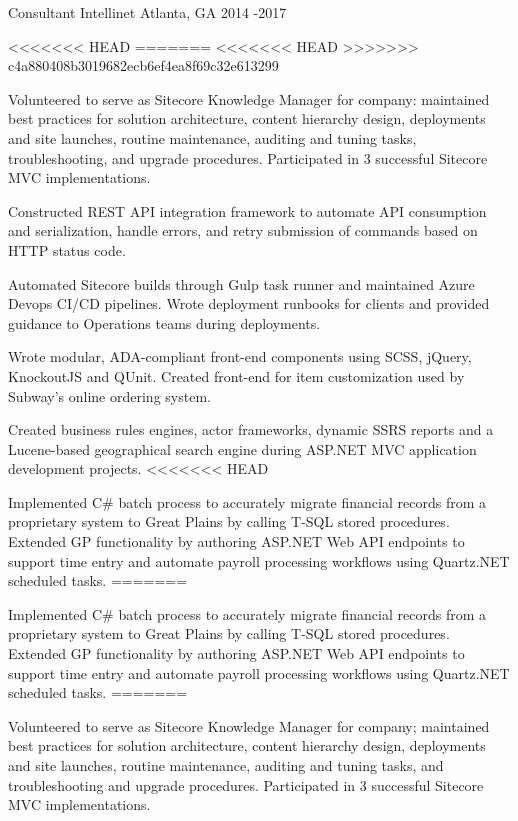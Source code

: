 \begin{cventries}
  \cventry
    {Consultant} %
    {Intellinet} %
    {Atlanta, GA} %
    {2014 -2017 } %
    {
      \begin{cvitems} %
<<<<<<< HEAD
=======
<<<<<<< HEAD
>>>>>>> c4a880408b3019682ecb6ef4ea8f69c32e613299
        \item {Volunteered to serve as Sitecore Knowledge Manager for company: maintained best practices for solution architecture, content hierarchy design, deployments and site launches, routine maintenance, auditing and tuning tasks, troubleshooting, and upgrade procedures. Participated in 3 successful Sitecore MVC implementations.}
		\item {Constructed REST API integration framework to automate API consumption and serialization, handle errors, and retry submission of commands based on HTTP status code.}
		\item {Automated Sitecore builds through Gulp task runner and maintained Azure Devops CI/CD pipelines. Wrote deployment runbooks for clients and provided guidance to Operations teams during deployments.}
		\item {Wrote modular, ADA-compliant front-end components using SCSS, jQuery, KnockoutJS and QUnit. Created front-end for item customization used by Subway’s online ordering system.}
		\item {Created business rules engines, actor frameworks, dynamic SSRS reports and a Lucene-based geographical search engine during ASP.NET MVC application development projects.}
<<<<<<< HEAD
		\item {Implemented C\# batch process to accurately migrate financial records from a proprietary system to Great Plains by calling T-SQL stored procedures. Extended GP functionality by authoring ASP.NET Web API endpoints to support time entry and automate payroll processing workflows using Quartz.NET scheduled tasks.}
=======
		\item {Implemented C# batch process to accurately migrate financial records from a proprietary system to Great Plains by calling T-SQL stored procedures. Extended GP functionality by authoring ASP.NET Web API endpoints to support time entry and automate payroll processing workflows using Quartz.NET scheduled tasks.}
=======
        \item {Volunteered to serve as Sitecore Knowledge Manager for company; maintained best practices for solution architecture, content hierarchy design, deployments and site launches, routine maintenance, auditing and tuning tasks, and troubleshooting and upgrade procedures. Participated in 3 successful Sitecore MVC implementations.}

\end{cvitems}}
\end{cventries}
